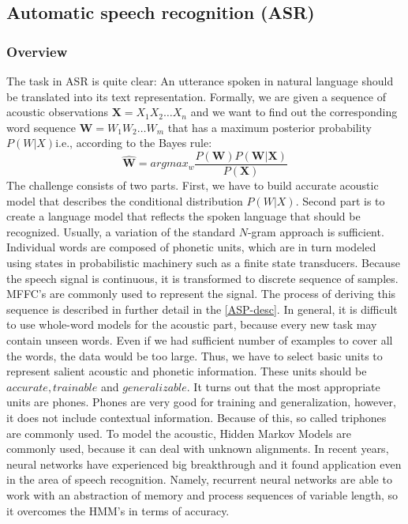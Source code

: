 \subsection{Automatic speech recognition (ASR)}
\label{ASR-desc}
\subsubsection*{Overview}
The task in ASR is quite clear: An utterance spoken in natural language should be translated into its text representation.
Formally, we are given a sequence of acoustic observations $\textbf{X} = X_1X_2\dots X_n$ and we want to find out the corresponding word sequence $\textbf{W} = W_1W_2\dots W_m$ that has a maximum posterior probability $P(W | X)$i.e., according to the Bayes rule:
\begin{equation}
\hat{\textbf{W}} = argmax_w \frac{P(\textbf{W})P(\textbf{W}|\textbf{X})}{P(\textbf{X})}
\end{equation}
The challenge consists of two parts.
First, we have to build accurate acoustic model that describes the conditional distribution $P(W|X)$.
Second part is to create a language model that reflects the spoken language that should be recognized.
Usually, a variation of the standard $N$-gram approach is sufficient.
Individual words are composed of phonetic units, which are in turn modeled using states in probabilistic machinery such as a finite state transducers.
Because the speech signal is continuous, it is transformed to discrete sequence of samples.
MFFC's are commonly used to represent the signal.
The process of deriving this sequence is described in further detail in the \ref{ASP-desc}.
In general, it is difficult to use whole-word models for the acoustic part, because every new task may contain unseen words.
Even if we had sufficient number of examples to cover all the words, the data would be too large.
Thus, we have to select basic units to represent salient acoustic and phonetic information.
These units should be $accurate, trainable$ and $generalizable$.
It turns out that the most appropriate units are phones.
Phones are very good for training and generalization, however, it does not include contextual information.
Because of this, so called triphones are commonly used.
To model the acoustic, Hidden Markov Models are commonly used, because it can deal with unknown alignments.
In recent years, neural networks have experienced big breakthrough and it found application even in the area of speech recognition.
Namely, recurrent neural networks are able to work with an abstraction of memory and process sequences of variable length, so it overcomes the HMM's in terms of accuracy.
